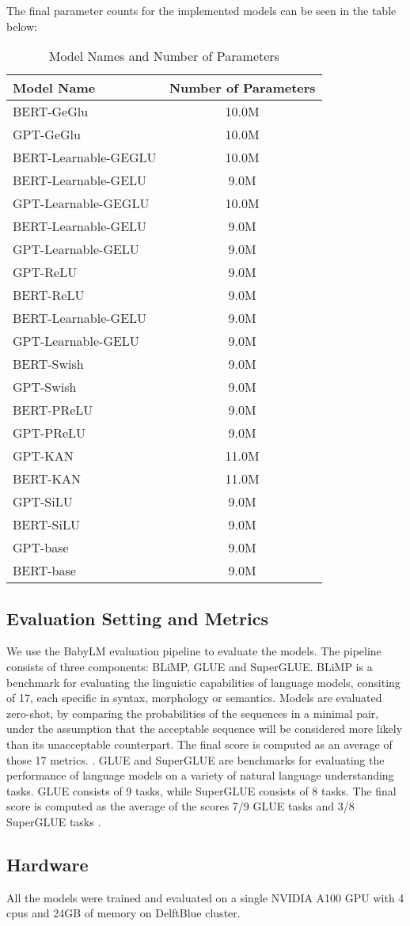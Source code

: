 The final parameter counts for the implemented models can be seen in the table below:
\begin{table}[h!]
    \centering
    \begin{tabular}{|l|c|}
    \hline
    \textbf{Model Name} & \textbf{Number of Parameters} \\ \hline
    BERT-GeGlu & 10.0M \\ \hline
    GPT-GeGlu & 10.0M \\ \hline
    BERT-Learnable-GEGLU & 10.0M \\ \hline
    BERT-Learnable-GELU & 9.0M \\ \hline
    GPT-Learnable-GEGLU & 10.0M \\ \hline
    BERT-Learnable-GELU & 9.0M \\ \hline
    GPT-Learnable-GELU & 9.0M \\ \hline
    GPT-ReLU & 9.0M \\ \hline
    BERT-ReLU & 9.0M \\ \hline
    BERT-Learnable-GELU & 9.0M \\ \hline
    GPT-Learnable-GELU & 9.0M \\ \hline
    BERT-Swish & 9.0M \\ \hline
    GPT-Swish & 9.0M \\ \hline
    BERT-PReLU & 9.0M \\ \hline
    GPT-PReLU & 9.0M \\ \hline
    GPT-KAN & 11.0M \\ \hline
    BERT-KAN & 11.0M \\ \hline
    GPT-SiLU & 9.0M \\ \hline
    BERT-SiLU & 9.0M \\ \hline
    GPT-base & 9.0M \\ \hline
    BERT-base & 9.0M \\ \hline
    \end{tabular}
    \caption{Model Names and Number of Parameters}
\end{table}

\subsection{Evaluation Setting and Metrics}
We use the BabyLM evaluation pipeline \cite{Warstadt2023} to evaluate the models. The pipeline consists of three components: BLiMP, GLUE and SuperGLUE. BLiMP is a benchmark for evaluating the linguistic capabilities of language models, consiting of 17, each specific in syntax, morphology or semantics. Models are evaluated zero-shot, by comparing the probabilities of the sequences in a minimal pair, under the assumption that the acceptable sequence will be considered more likely than its unacceptable counterpart. The final score is computed as an average of those 17 metrics. \cite{Warstadt2023blimp} \cite{warstadt-etal-2023-findings}.  GLUE and SuperGLUE are benchmarks for evaluating the performance of language models on a variety of natural language understanding tasks. GLUE consists of 9 tasks, while SuperGLUE consists of 8 tasks. The final score is computed as the average of the scores 7/9 GLUE tasks and 3/8 SuperGLUE tasks \cite{Wang2019} \cite{Wang2020}.

\subsection{Hardware}
All the models were trained and evaluated on a single NVIDIA A100 GPU with 4 cpus and 24GB of memory on DelftBlue cluster.